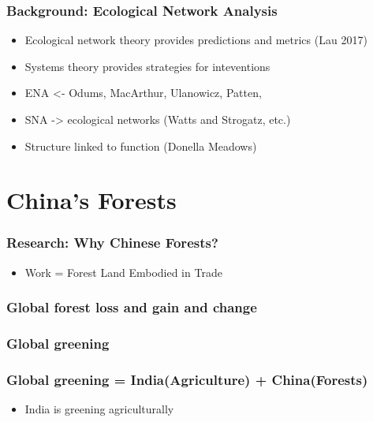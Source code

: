 \documentclass{beamer}
\begin{document}
\begin{frame}
  \frametitle{Background: Ecological Network Analysis}

  \begin{itemize}
\item Ecological network theory provides predictions and metrics (Lau 2017)
\item Systems theory provides strategies for inteventions
\item ENA <- Odums, MacArthur, Ulanowicz, Patten,
\item SNA -> ecological networks (Watts and Strogatz, etc.)
\item Structure linked to function (Donella Meadows)
  \end{itemize}


\section{China's Forests}

\end{frame}

\begin{frame}
  \frametitle{Research: Why Chinese Forests?}

  \begin{itemize}
\item Work = Forest Land Embodied in Trade
  \end{itemize}

\end{frame}

\begin{frame}
  \frametitle{Global forest loss and gain and change}



\end{frame}

\begin{frame}
  \frametitle{Global greening}



\end{frame}

\begin{frame}
  \frametitle{Global greening = India(Agriculture) + China(Forests)}

  \begin{itemize}
  \item India is greening agriculturally
  \end{itemize}

\end{frame}
\end{document}
